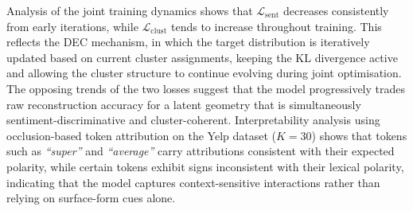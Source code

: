 {%
Analysis of the joint training dynamics shows that
$\mathcal{L}_{\text{sent}}$ decreases consistently from early iterations,
while $\mathcal{L}_{\text{clust}}$ tends to increase throughout training.
This reflects the DEC mechanism, in which the target distribution is
iteratively updated based on current cluster assignments, keeping the
KL divergence active and allowing the cluster structure to continue
evolving during joint optimisation. The opposing trends of the two losses
suggest that the model progressively trades raw reconstruction accuracy
for a latent geometry that is simultaneously sentiment-discriminative and
cluster-coherent. Interpretability analysis using occlusion-based token attribution on the
Yelp dataset ($K = 30$) shows that tokens such as \textit{``super''} and
\textit{``average''} carry attributions consistent with their expected
polarity, while certain tokens exhibit signs inconsistent with their
lexical polarity, indicating that the model captures context-sensitive
interactions rather than relying on surface-form cues alone.



}
